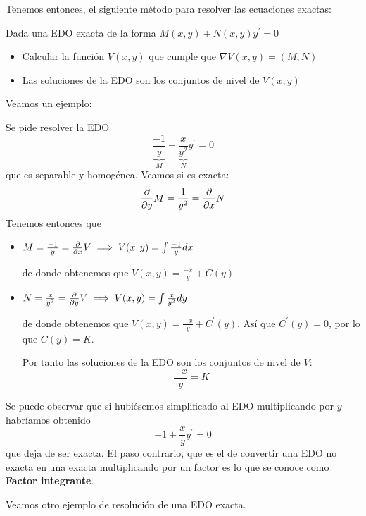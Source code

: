 Tenemos entonces, el siguiente método para resolver las ecuaciones exactas:
\begin{method}
Dada una EDO exacta de la forma $M(x,y) + N(x,y)y^\prime = 0$
\begin{itemize}
\item Calcular la función $V(x,y)$ que cumple que $\nabla V(x,y) = (M,N)$
\item Las soluciones de la EDO son los conjuntos de nivel de $V(x,y)$
\end{itemize}
\end{method}

Veamos un ejemplo:

\begin{example}
Se pide resolver la EDO $$\underbrace{\frac{-1}{y}}_M+\underbrace{\frac{x}{y^2}}_Ny^\prime = 0$$ que es separable y homogénea.
Veamos si es exacta: $$\frac{\partial}{\partial y}M = \frac{1}{y^2} = \frac{\partial}{\partial x}N$$
Tenemos entonces que
\begin{itemize}
\item $M = \frac{-1}{y} = \frac{\partial}{\partial x}V \implies V(x,y) = \int \frac{-1}{y}dx$

de donde obtenemos que $V(x,y) = \frac{-x}{y} + C(y)$

\item $N = \frac{x}{y^2} = \frac{\partial}{\partial y}V \implies V(x,y) = \int \frac{x}{y^2}dy$

de donde obtenemos que $V(x,y) = \frac{-x}{y} + C^\prime(y)$. Así que $C^\prime(y) = 0$, por lo que $C(y) = K$.

Por tanto las soluciones de la EDO son los conjuntos de nivel de $V$: $$\frac{-x}{y} = K$$
\end{itemize}

Se puede observar que si hubiésemos simplificado al EDO multiplicando por $y$ habríamos obtenido $$-1+\frac{x}{y}y^\prime = 0$$ que deja de ser exacta. El paso contrario, que es el de convertir una EDO no exacta en una exacta multiplicando por un factor es lo que se conoce como \textbf{Factor integrante}.
\end{example}

Veamos otro ejemplo de resolución de una EDO exacta.

